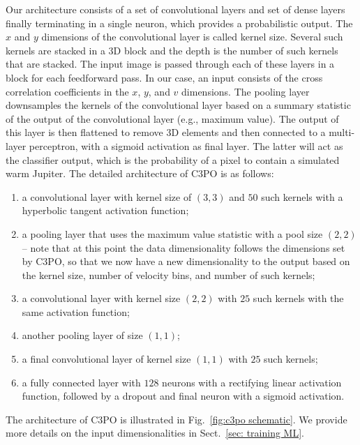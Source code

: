\documentclass{aa}
\begin{document}
Our architecture consists of a set of convolutional layers and set of dense layers finally terminating in a single neuron, which provides a probabilistic output.
The $x$ and $y$ dimensions of the convolutional layer is called kernel size.
Several such kernels are stacked in a 3D block and the depth is the number of such kernels that are stacked.
The input image is passed through each of these layers in a block for each feedforward pass.
In our case, an input consists of the cross correlation coefficients in the $x$, $y$, and $v$ dimensions.
The pooling layer downsamples the kernels of the convolutional layer based on a summary statistic of the output of the convolutional layer (e.g., maximum value).
The output of this layer is then flattened to remove 3D elements and then connected to a multi-layer perceptron, with a sigmoid activation as final layer. 
The latter will act as the classifier output, which is the probability of a pixel to contain a simulated warm Jupiter. The detailed architecture of C3PO is as follows:
\begin{enumerate}
    \item a convolutional layer with kernel size of $\left(3,3\right)$ and $50$ such kernels with a hyperbolic tangent activation function;
    \item a pooling layer that uses the maximum value statistic with a pool size $\left(2,2\right)$ -- note that at this point the data dimensionality follows the dimensions set by C3PO, so that we now have a new dimensionality to the output based on the kernel size, number of velocity bins, and number of such kernels;
    \item a convolutional layer with kernel size $\left(2,2\right)$ with $25$ such kernels with the same activation function;
    \item another pooling layer of size $(1,1)$;
    \item a final convolutional layer of kernel size $(1,1)$ with $25$ such kernels;
    \item a fully connected layer with $128$ neurons with a rectifying linear activation function, followed by a dropout and final neuron with a sigmoid activation.
\end{enumerate}
The architecture of C3PO is illustrated in Fig.~\ref{fig:c3po schematic}. We provide more details on the input dimensionalities in Sect.~\ref{sec: training ML}.
\end{document}
